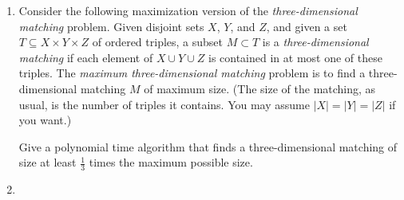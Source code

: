 \documentclass[12pt]{article}
\begin{document}
\begin{enumerate}
{\begin{proof}
Therefore the optimal solution is not worse that this particular one.
That is,
$$w_{LP} \le  \sum_{i=1}^n w_i x_i =  \sum_{a_i\in S} w_i = w(S^*)$$
\end{proof}

Therefore we have a hitting set $S$, such that $w(S) \le b\cdot w(S^*)$.

}


\item 

Consider the following maximization version of the
{\em three-dimensional matching} problem. Given disjoint sets $X$, $Y$, and
$Z$, and given a set $T \subseteq X \times Y \times Z$
of ordered triples, a subset $M \subset T$ is a {\em three-dimensional
matching} if each element of $X \cup Y \cup Z$ is contained in
at most one of these triples. The {\em maximum three-dimensional matching}
problem is to find a three-dimensional matching $M$ of maximum size.
(The size of the matching, as usual, is the number of triples
it contains.  You may assume $|X| = |Y| = |Z|$ if you want.)

Give a polynomial time algorithm that finds a three-dimensional matching
of size at least $\frac{1}{3}$ times the maximum possible size.



\item 


\end{enumerate}
\end{document}
